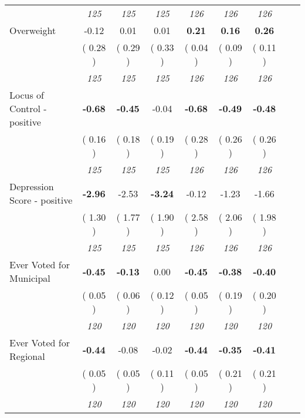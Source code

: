 \begin{tabular}{l c c c c c c c c}
& \textit{ 125 } & \textit{ 125 } & \textit{ 125 } & \textit{ 126 } & \textit{ 126 } & \textit{ 126 } \\
Overweight &     -0.12 &      0.01 &      0.01 & \textbf{      0.21 } & \textbf{      0.16 } & \textbf{      0.26 } \\
& (     0.28 ) & (     0.29 ) & (     0.33 ) & (     0.04 ) & (     0.09 ) & (     0.11 ) \\
& \textit{ 125 } & \textit{ 125 } & \textit{ 125 } & \textit{ 126 } & \textit{ 126 } & \textit{ 126 } \\
Locus of Control - positive & \textbf{     -0.68 } & \textbf{     -0.45 } &     -0.04 & \textbf{     -0.68 } & \textbf{     -0.49 } & \textbf{     -0.48 } \\
& (     0.16 ) & (     0.18 ) & (     0.19 ) & (     0.28 ) & (     0.26 ) & (     0.26 ) \\
& \textit{ 125 } & \textit{ 125 } & \textit{ 125 } & \textit{ 126 } & \textit{ 126 } & \textit{ 126 } \\
Depression Score - positive & \textbf{     -2.96 } &     -2.53 & \textbf{     -3.24 } &     -0.12 &     -1.23 &     -1.66 \\
& (     1.30 ) & (     1.77 ) & (     1.90 ) & (     2.58 ) & (     2.06 ) & (     1.98 ) \\
& \textit{ 125 } & \textit{ 125 } & \textit{ 125 } & \textit{ 126 } & \textit{ 126 } & \textit{ 126 } \\
Ever Voted for Municipal & \textbf{     -0.45 } & \textbf{     -0.13 } &      0.00 & \textbf{     -0.45 } & \textbf{     -0.38 } & \textbf{     -0.40 } \\
& (     0.05 ) & (     0.06 ) & (     0.12 ) & (     0.05 ) & (     0.19 ) & (     0.20 ) \\
& \textit{ 120 } & \textit{ 120 } & \textit{ 120 } & \textit{ 120 } & \textit{ 120 } & \textit{ 120 } \\
Ever Voted for Regional & \textbf{     -0.44 } &     -0.08 &     -0.02 & \textbf{     -0.44 } & \textbf{     -0.35 } & \textbf{     -0.41 } \\
& (     0.05 ) & (     0.05 ) & (     0.11 ) & (     0.05 ) & (     0.21 ) & (     0.21 ) \\
& \textit{ 120 } & \textit{ 120 } & \textit{ 120 } & \textit{ 120 } & \textit{ 120 } & \textit{ 120 } \\
\bottomrule
\end{tabular}

